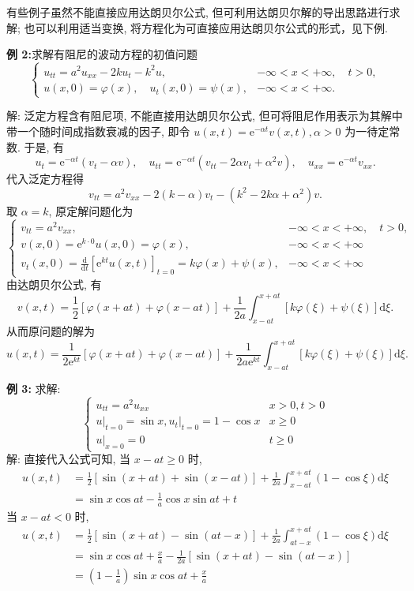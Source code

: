 有些例子虽然不能直接应用达朗贝尔公式, 但可利用达朗贝尔解的导出思路进行求解; 也可以利用适当变换, 将方程化为可直接应用达朗贝尔公式的形式，见下例.

\textbf{例 2:}求解有阻尼的波动方程的初值问题
$$
\left\{\begin{array}{ll}
u_{t t}=a^{2} u_{x x}-2 k u_{t}-k^{2} u, & -\infty<x<+\infty, \quad t>0, \\
u(x, 0)=\varphi(x), \quad u_{t}(x, 0)=\psi(x), & -\infty<x<+\infty .
\end{array}\right.
$$

解: 泛定方程含有阻尼项, 不能直接用达朗贝尔公式, 但可将阻尼作用表示为其解中带一个随时间成指数衰减的因子, 即令 $ u(x, t)=\mathrm{e}^{-\alpha t} v(x, t), \alpha>0 $ 为一待定常数. 于是, 有
$$
u_{t}=\mathrm{e}^{-\alpha t}\left(v_{t}-\alpha v\right), \quad u_{t t}=\mathrm{e}^{-\alpha t}\left(v_{t t}-2 \alpha v_{t}+\alpha^{2} v\right), \quad u_{x x}=\mathrm{e}^{-\alpha t} v_{x x} .
$$
代入泛定方程得
$$
v_{t t}=a^{2} v_{x x}-2(k-\alpha) v_{t}-\left(k^{2}-2 k \alpha+\alpha^{2}\right) v .
$$
取 $ \alpha=k $, 原定解问题化为
$$
\left\{\begin{array}{ll}
v_{t t}=a^{2} v_{x x}, & -\infty<x<+\infty, \quad t>0, \\
v(x, 0)=\mathrm{e}^{k \cdot 0} u(x, 0)=\varphi(x), & -\infty<x<+\infty \\
v_{t}(x, 0)=\frac{\mathrm{d}}{\mathrm{d} t}\left[\mathrm{e}^{k t} u(x, t)\right]_{t=0}=k \varphi(x)+\psi(x), & -\infty<x<+\infty
\end{array}\right.
$$
由达朗贝尔公式, 有
$$
v(x, t)=\frac{1}{2}[\varphi(x+a t)+\varphi(x-a t)]+\frac{1}{2 a} \int_{x-a t}^{x+a t}[k \varphi(\xi)+\psi(\xi)] \mathrm{d} \xi .
$$
从而原问题的解为
$$
u(x, t)=\frac{1}{2 \mathrm{e}^{k t}}[\varphi(x+a t)+\varphi(x-a t)]+\frac{1}{2 a \mathrm{e}^{k t}} \int_{x-a t}^{x+a t}[k \varphi(\xi)+\psi(\xi)] \mathrm{d} \xi .
$$

\textbf{例 3: }求解:
$$
\left\{\begin{array}{ll}
u_{t t}=a^{2} u_{x x} & x>0, t>0 \\
\left.u\right|_{t=0}=\sin x,\left.u_{t}\right|_{t=0}=1-\cos x & x \geqslant 0 \\
\left.u\right|_{x=0}=0 & t \geqslant 0
\end{array}\right.
$$
解: 直接代入公式可知, 当 $ x-a t \geqslant 0 $ 时,
$$
\begin{aligned}
u(x, t) & =\frac{1}{2}[\sin (x+a t)+\sin (x-a t)]+\frac{1}{2 a} \int_{x-a t}^{x+a t}(1-\cos \xi) \mathrm{d} \xi \\
& =\sin x \cos a t-\frac{1}{a} \cos x \sin a t+t
\end{aligned}
$$
当 $ x-a t<0 $ 时,
$$
\begin{aligned}
u(x, t) & =\frac{1}{2}[\sin (x+a t)-\sin (a t-x)]+\frac{1}{2 a} \int_{a t-x}^{x+a t}(1-\cos \xi) \mathrm{d} \xi \\
& =\sin x \cos a t+\frac{x}{a}-\frac{1}{2 a}[\sin (x+a t)-\sin (a t-x)] \\
& =\left(1-\frac{1}{a}\right) \sin x \cos a t+\frac{x}{a}
\end{aligned}
$$
